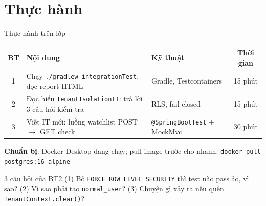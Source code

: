 \documentclass[aspectratio=169,12pt]{beamer}
\begin{document}
\section{Thực hành}

\begin{frame}{Thực hành trên lớp}
  \begin{center}
  \footnotesize
  \setlength{\tabcolsep}{4pt}
  \begin{tabular}{c>{\raggedright\arraybackslash}p{5.6cm}>{\raggedright\arraybackslash}p{3.6cm}c}
    \toprule
    \textbf{BT} & \textbf{Nội dung} & \textbf{Kỹ thuật} & \textbf{Thời gian} \\
    \midrule
    1 & Chạy \texttt{./gradlew integrationTest}, đọc report HTML &
        Gradle, Testcontainers & 15 phút \\
    2 & Đọc hiểu \texttt{TenantIsolationIT}: trả lời 3 câu hỏi kiểm tra &
        RLS, fail-closed & 15 phút \\
    3 & Viết IT mới: luồng watchlist POST $\to$ GET check &
        \texttt{@SpringBootTest} + MockMvc & 30 phút \\
    \bottomrule
  \end{tabular}
  \end{center}
  {\small \textbf{Chuẩn bị}: Docker Desktop đang chạy; pull image trước cho
  nhanh: \texttt{docker pull postgres:16-alpine}}

  \vspace{0.3em}
  \begin{exampleblock}{3 câu hỏi của BT2}
    \small (1) Bỏ \texttt{FORCE ROW LEVEL SECURITY} thì test nào pass ảo, vì sao?
    (2) Vì sao phải tạo \texttt{normal\_user}?
    (3) Chuyện gì xảy ra nếu quên \texttt{TenantContext.clear()}?
  \end{exampleblock}
\end{frame}
\end{document}
